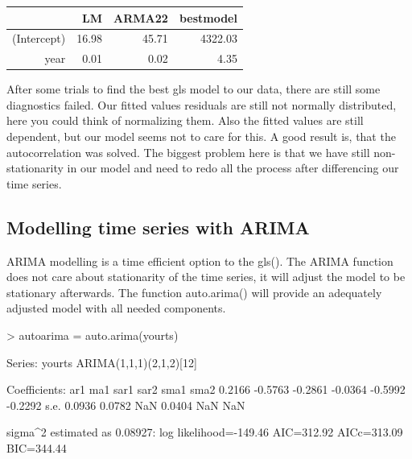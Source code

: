 \documentclass[11pt, a4paper]{article} %
\begin{document}
\begin{table}[ht]
\centering
\begin{tabular}{rrrr}
  \hline
 & LM & ARMA22 & bestmodel \\ 
  \hline
(Intercept) & 16.98 & 45.71 & 4322.03 \\ 
  year & 0.01 & 0.02 & 4.35 \\ 
   \hline
\end{tabular}
\end{table}\linebreak


\noindent After some trials to find the best gls model to our data, there are still some diagnostics failed. Our fitted values residuals are still not normally distributed, here you could think of normalizing them. Also the fitted values are still dependent, but our model seems not to care for this. A good result is, that the autocorrelation was solved. The biggest problem here is that we have still non-stationarity in our model and need to redo all the process after differencing our time series. 



\subsection{Modelling time series with ARIMA }
ARIMA modelling is a time efficient option to the gls(). 
The ARIMA function does not care about stationarity of the time series, it will adjust the model  to be stationary afterwards. 
The function auto.arima() will provide an adequately adjusted model with all needed components. 
\\


\begin{Schunk}
\begin{Sinput}
> autoarima = auto.arima(yourts)
\end{Sinput}
Series: yourts 
ARIMA(1,1,1)(2,1,2)[12]                    

Coefficients:
         ar1      ma1     sar1     sar2     sma1     sma2
      0.2166  -0.5763  -0.2861  -0.0364  -0.5992  -0.2292
s.e.  0.0936   0.0782      NaN   0.0404      NaN      NaN

sigma^2 estimated as 0.08927:  log likelihood=-149.46
AIC=312.92   AICc=313.09   BIC=344.44\end{Schunk}
\end{document}
